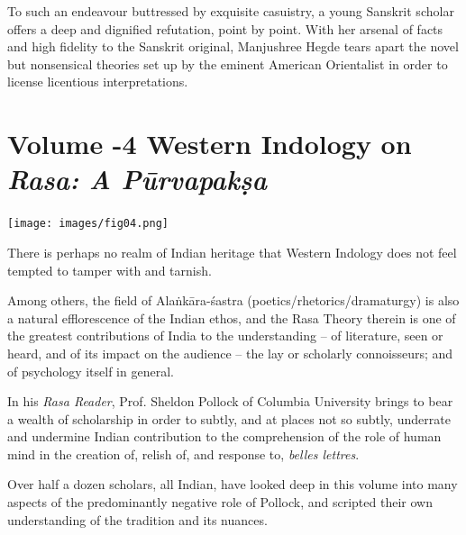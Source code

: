 To such an endeavour buttressed by exquisite casuistry, a young Sanskrit scholar offers a deep and dignified refutation, point by point. With her arsenal of facts and high fidelity to the Sanskrit original, Manjushree Hegde tears apart the novel but nonsensical theories set up by the eminent American Orientalist in order to license licentious interpretations.


\section*{\num{Volume -4} Western Indology on \textit{Rasa: A Pūrvapakṣa}}

\texttt{[image: images/fig04.png]}

There is perhaps no realm of Indian heritage that Western Indology does not feel tempted to tamper with and tarnish.

Among others, the field of Alaṅkāra-śastra (poetics/rhetorics/dramaturgy) is also a natural efflorescence of the Indian ethos, and the Rasa Theory therein is one of the greatest contributions of India to the understanding – of literature, seen or heard, and of its impact on the audience – the lay or scholarly connoisseurs; and of psychology itself in general.

In his \textit{Rasa Reader}, Prof. Sheldon Pollock of Columbia University brings to bear a wealth of scholarship in order to subtly, and at places not so subtly, underrate and undermine Indian contribution to the comprehension of the role of human mind in the creation of, relish of, and response to, \textit{belles lettres}.

Over half a dozen scholars, all Indian, have looked deep in this volume into many aspects of the predominantly negative role of Pollock, and scripted their own understanding of the tradition and its nuances.

